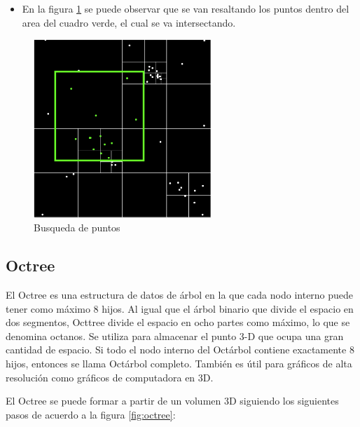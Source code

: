 \documentclass{article}
\begin{document}
\begin{itemize}
	\item En la figura \ref{fig:quadtree_search} se puede observar que se van resaltando los puntos dentro del area del cuadro verde, el cual se va intersectando.
\end{itemize}

\begin{figure}[h!]
	\centering
	\includegraphics[width=0.6\textwidth]{img/quadtree_search.png}
	\caption{Busqueda de puntos}
	\label{fig:quadtree_search}
\end{figure}
\clearpage
\subsection{Octree}

El Octree es una estructura de datos de árbol en la que cada nodo interno puede tener como máximo 8 hijos. Al igual que el árbol binario que divide el espacio en dos segmentos, Octtree divide el espacio en ocho partes como máximo, lo que se denomina octanos. Se utiliza para almacenar el punto 3-D que ocupa una gran cantidad de espacio. Si todo el nodo interno del Octárbol contiene exactamente 8 hijos, entonces se llama Octárbol completo. También es útil para gráficos de alta resolución como gráficos de computadora en 3D.

El Octree se puede formar a partir de un volumen 3D siguiendo los siguientes pasos de acuerdo a la figura \ref{fig:octree}:
\end{document}

